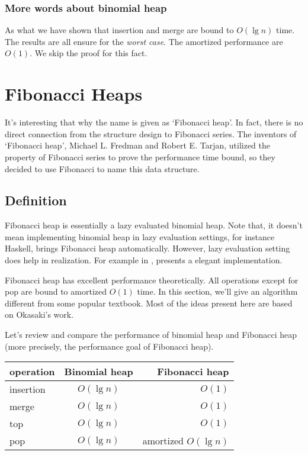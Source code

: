 \documentclass{article}
\begin{document}
\subsubsection{More words about binomial heap}
As what we have shown that insertion and merge are bound to $O(\lg n)$
time. The results are all ensure for the {\em worst case}. The
amortized performance are $O(1)$. We skip the proof for this
fact.

\section{Fibonacci Heaps}
\label{fib-heap} 

It's interesting that why the name is given as `Fibonacci heap'.
In fact, there is no direct connection from the structure design
to Fibonacci series. The inventors of `Fibonacci heap', Michael L.
Fredman and Robert E. Tarjan, utilized the property of Fibonacci series
to prove the performance time bound, so they decided to use Fibonacci
to name this data structure.\cite{CLRS}

\subsection{Definition}

Fibonacci heap is essentially a lazy evaluated binomial heap. Note
that, it doesn't mean implementing binomial heap in lazy evaluation
settings, for instance Haskell, brings Fibonacci heap automatically.
However, lazy evaluation setting does help in realization. For example
in \cite{hackage-fibq}, presents a elegant implementation.

Fibonacci heap has excellent performance theoretically. All operations
except for pop are bound to amortized $O(1)$ time. In this section,
we'll give an algorithm different from some popular textbook\cite{CLRS}.
Most of the ideas present here are based on Okasaki's work\cite{okasaki-fibh}.

Let's review and compare the performance of binomial heap and Fibonacci
heap (more precisely, the performance goal of Fibonacci heap).

\begin{tabular}{l | c | r}
  \hline
  operation & Binomial heap & Fibonacci heap \\
  \hline
  insertion & $O(\lg n)$ & $O(1)$ \\
  merge & $O(\lg n)$ & $O(1)$ \\
  top & $O(\lg n)$ & $O(1)$ \\
  pop & $O(\lg n)$ & amortized $O(\lg n)$ \\
  \hline
\end{tabular}
\end{document}
